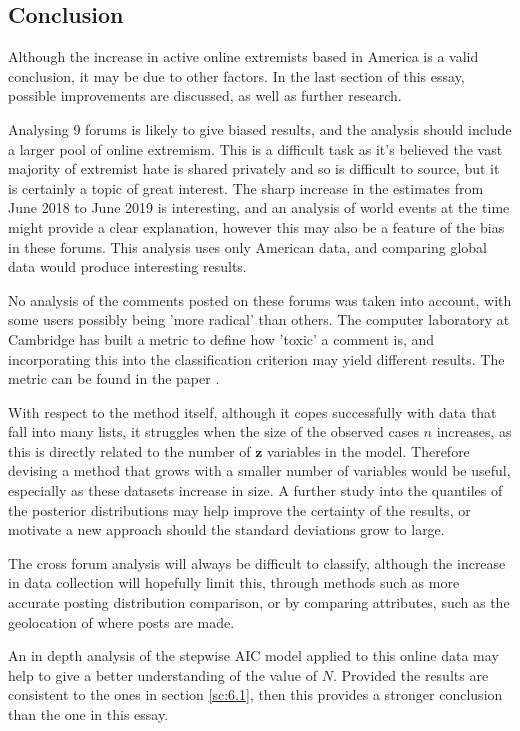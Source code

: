 \documentclass[10pt,a4paper,notitlepage]{article}
\begin{document}
\subsection{Conclusion}
Although the increase in active online extremists based in America is a valid conclusion, it may be due to other factors. In the last section of this essay, possible improvements are discussed, as well as further research.

Analysing 9 forums is likely to give biased results, and the analysis should include a larger pool of online extremism. This is a difficult task as it's believed the vast majority of extremist hate is shared privately and so is difficult to source, but it is certainly a topic of great interest. The sharp increase in the estimates from June 2018 to June 2019 is interesting, and an analysis of world events at the time might provide a clear explanation, however this may also be a feature of the bias in these forums. This analysis uses only American data, and comparing global data would produce interesting results.

No analysis of the comments posted on these forums was taken into account, with some users possibly being 'more radical' than others. The computer laboratory at Cambridge has built a metric to define how 'toxic' a comment is, and incorporating this into the classification criterion may yield different results. The metric can be found in the paper \cite{ExtremeBB}.

With respect to the method itself, although it copes successfully with data that fall into many lists, it struggles when the size of the observed cases $n$ increases, as this is directly related to the number of $\bm{z}$ variables in the model. Therefore devising a method that grows with a smaller number of variables would be useful, especially as these datasets increase in size. A further study into the quantiles of the posterior distributions may help improve the certainty of the results, or motivate a new approach should the standard deviations grow to large.

The cross forum analysis will always be difficult to classify, although the increase in data collection will hopefully limit this, through methods such as more accurate posting distribution comparison, or by comparing attributes, such as the geolocation of where posts are made.

An in depth analysis of the stepwise AIC model applied to this online data may help to give a better understanding of the value of $N$. Provided the results are consistent to the ones in section \ref{sc:6.1}, then this provides a stronger conclusion than the one in this essay.\\ \\
\end{document}
